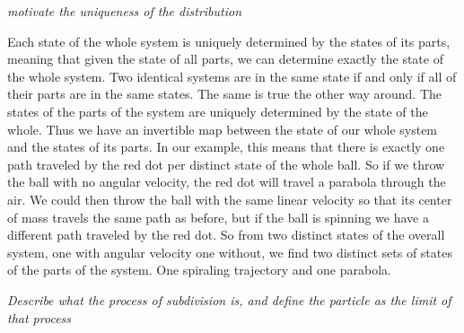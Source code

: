 \documentclass{article}
\begin{document}
	\emph{motivate the uniqueness of the distribution}	
	
	Each state of the whole system is uniquely determined by the states of its parts, meaning that given the state of all parts, we can determine exactly the state of the whole system. Two identical systems are in the same state if and only if all of their parts are in the same states. The same is true the other way around. The states of the parts of the system are uniquely determined by the state of the whole. Thus we have an invertible map between the state of our whole system and the states of its parts. In our example, this means that there is exactly one path traveled by the red dot per distinct state of the whole ball. So if we throw the ball with no angular velocity, the red dot will travel a parabola through the air. We could then throw the ball with the same linear velocity so that its center of mass travels the same path as before, but if the ball is spinning we have a different path traveled by the red dot. So from two distinct states of the overall system, one with angular velocity one without, we find two distinct sets of states of the parts of the system. One spiraling trajectory and one parabola.
		
	 
	 \emph{Describe what the process of subdivision is, and define the particle as the limit of that process}
	 
\end{document}
